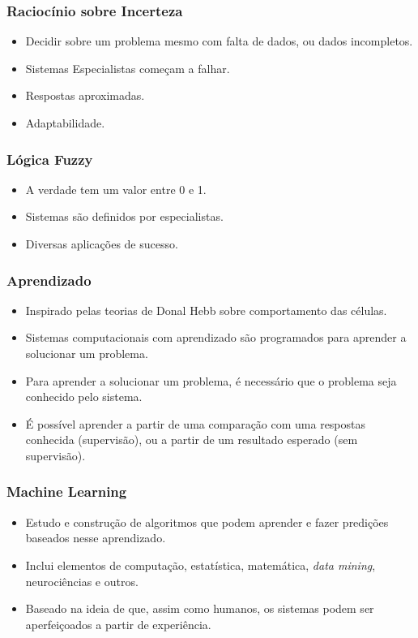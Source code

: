 \documentclass[aspectratio=169,12pt]{beamer}
\begin{document}
\begin{frame}
    \frametitle{Raciocínio sobre Incerteza}
    \begin{itemize}
        \setlength\itemsep{1em}
        \item Decidir sobre um problema mesmo com falta de dados,
        ou dados incompletos.
        \item Sistemas Especialistas começam a falhar.
        \item Respostas aproximadas.
        \item Adaptabilidade.
    \end{itemize}
\end{frame}

\begin{frame}
    \frametitle{Lógica Fuzzy}
    \begin{itemize}
        \setlength\itemsep{1em}
        \item A verdade tem um valor entre 0 e 1.
        \item Sistemas são definidos por especialistas.
        \item Diversas aplicações de sucesso.
    \end{itemize}
\end{frame}

\begin{frame}
    \frametitle{Aprendizado}
    \begin{itemize}
        \setlength\itemsep{1em}
        \item Inspirado pelas teorias de Donal Hebb sobre comportamento
        das células.
        \item Sistemas computacionais com aprendizado são programados
        para aprender a solucionar um problema.
        \item Para aprender a solucionar um problema, é necessário que
        o problema seja conhecido pelo sistema.
        \item É possível aprender a partir de uma comparação com uma
        respostas conhecida (supervisão), ou a partir de um resultado
        esperado (sem supervisão).
    \end{itemize}
\end{frame}

\begin{frame}
    \frametitle{Machine Learning}
    \begin{itemize}
        \setlength\itemsep{1em}
        \item Estudo e construção de algoritmos que podem aprender
        e fazer predições baseados nesse aprendizado.
        \item Inclui elementos de computação, estatística, matemática,
        \emph{data mining}, neurociências e outros.
        \item Baseado na ideia de que, assim como humanos, os
        sistemas podem ser aperfeiçoados a partir de experiência.
    \end{itemize}
\end{frame}
\end{document}
